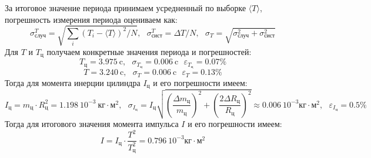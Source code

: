 \documentclass[a4paper,12pt]{article} %
\begin{document}
За итоговое значение периода принимаем усредненный по выборке $\langle T \rangle $,
погрешность измерения периода оцениваем как:
$$\sigma^T_\text{случ}=\sqrt{\sum_{i} (T_{i}-\langle T \rangle)^2 /N }, \ \ \ \sigma^T_\text{сист}=\Delta T/ N, \ \ \ 
\sigma_{T}=\sqrt{\sigma^2_\text{случ}+\sigma^2_\text{сист}}$$
Для $T$ и $T_{\text{ц}}$ получаем конкретные значения периода и погрешностей:
$$T_{\text{ц}}=3.975 \ \text{c}, \ \ \ \sigma_{T_{\text{ц}}}=0.006\ \text{c} \ \ \ \varepsilon_{T_{\text{ц}}}=0.07 \% $$
$$T=3.240\ \text{c},\ \ \ \sigma_{T}=0.006\ \text{c} \ \ \ \varepsilon_{T}=0.13\% $$
Тогда для момента инерции цилиндра $I_{\text{ц}}$ и его погрешности имеем:
$$I_{\text{ц}}=m_{\text{ц}}\cdot R^2_{\text{ц}}= 1.198 \ 10^{-3} \ \text{кг}\cdot\text{м}^2, \ \ \ 
\sigma_{I_{\text{ц}}}=I_{\text{ц}}
\sqrt{\left(\frac{\Delta m_{\text{ц}}}{m_{\text{ц}}}\right)^2
+\left(\frac{2 \Delta R_{\text{ц}}}{R_{\text{ц}}}\right)^2}\approx 0.006 \ 10^{-3}\text{кг}\cdot\text{м}^2, \ \ \
\varepsilon_{I_{\text{ц}}}=0.5 \% $$
Тогда для итогового значения момента импульса $I$ и его погрешности имеем:
$$I=I_{\text{ц}}\cdot\frac{T^2}{T^2_{\text{ц}}}=0.796 \ 10^{-3}\text{кг}\cdot\text{м}^2$$
\end{document}
